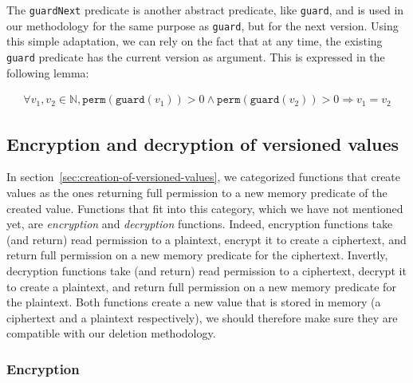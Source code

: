 The \texttt{guardNext} predicate is another abstract predicate, like \texttt{guard}, and is used in our methodology for the same purpose as \texttt{guard}, but for the next version. 
Using this simple adaptation, we can rely on the fact that at any time, the existing \texttt{guard} predicate has the current version as argument.
This is expressed in the following lemma:

\begin{lemma}\label{lem:unique-version}
    \begin{align*}
        \forall v_1, v_2 \in \mathbb{N}, \texttt{perm}(\texttt{guard}(v_1)) > 0 \land \texttt{perm}(\texttt{guard}(v_2)) > 0 \Rightarrow v_1 = v_2
    \end{align*}
\end{lemma}

\subsection{Encryption and decryption of versioned values}

In section~\ref{sec:creation-of-versioned-values}, we categorized functions that create values as the ones returning full permission to a new memory predicate of the created value.
Functions that fit into this category, which we have not mentioned yet, are \emph{encryption} and \emph{decryption} functions.
Indeed, encryption functions take (and return) read permission to a plaintext, encrypt it to create a ciphertext, and return full permission on a new memory predicate for the ciphertext.
Invertly, decryption functions take (and return) read permission to a ciphertext, decrypt it to create a plaintext, and return full permission on a new memory predicate for the plaintext.
Both functions create a new value that is stored in memory (a ciphertext and a plaintext respectively), we should therefore make sure they are compatible with our deletion methodology.

\subsubsection{Encryption}

